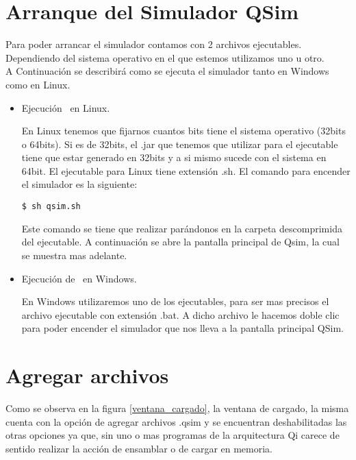 

\section{Arranque del Simulador QSim}
Para poder arrancar el simulador contamos con 2 archivos ejecutables. 
Dependiendo del sistema operativo en el que estemos utilizamos uno u otro.\\

A Continuación se describirá como se ejecuta el simulador \qsim tanto en Windows como en Linux.
\begin{itemize}

\item Ejecución \qsim\ en Linux.

En Linux tenemos que fijarnos cuantos bits tiene el sistema operativo (32bits o 64bits). Si es de 32bits, el .jar que tenemos que utilizar para el ejecutable tiene que estar generado en 32bits y a si mismo sucede con el sistema en 64bit. El ejecutable para Linux tiene extensión .sh. El comando para encender el simulador es la siguiente:

\begin{verbatim}
$ sh qsim.sh
\end{verbatim}

Este comando se tiene que realizar parándonos en la carpeta descomprimida del ejecutable. 
A continuación se abre la pantalla principal de Qsim, la cual se muestra mas adelante.

\item Ejecución de \qsim\ en Windows.

En Windows utilizaremos uno de los ejecutables, para ser mas precisos el archivo ejecutable con extensión .bat.
A dicho archivo le hacemos doble clic para poder encender el simulador que nos lleva a la pantalla principal QSim.

 
\end{itemize}

\section{Agregar archivos}
Como se observa en la figura \ref{ventana_cargado}, la ventana de cargado, la misma cuenta con la opción de agregar archivos .qsim y se encuentran deshabilitadas las otras opciones ya que, sin uno o mas programas de la arquitectura Qi carece de sentido realizar la acción de ensamblar o de cargar en memoria.

